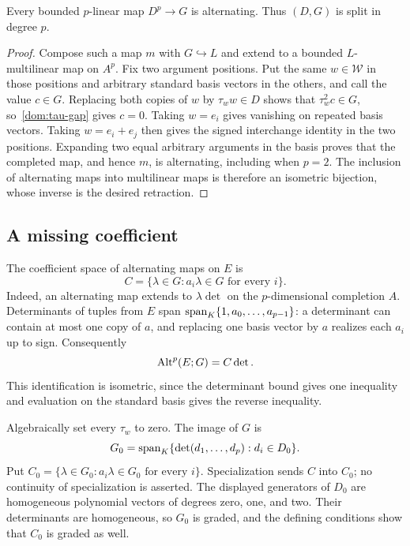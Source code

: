 \begin{lemma}\label{dom:all-alt}
Every bounded $p$\nobreakdash-linear map $D^p\to G$ is alternating. Thus $(D,G)$ is split in degree $p$.
\end{lemma}

\begin{proof}
Compose such a map $m$ with $G\hookrightarrow L$ and extend to a bounded $L$\nobreakdash-multilinear map
on $A^p$. Fix two argument positions. Put the same $w\in\mathcal W$ in those positions and arbitrary
standard basis vectors in the others, and call the value $c\in G$. Replacing both copies of $w$ by
$\tau_w w\in D$ shows that $\tau_w^2c\in G$, so~\eqref{dom:tau-gap} gives $c=0$.
Taking $w=e_i$ gives vanishing on repeated basis vectors. Taking $w=e_i+e_j$ then gives the signed
interchange identity in the two positions. Expanding two equal arbitrary arguments in the basis proves
that the completed map, and hence $m$, is alternating, including when $p=2$. The inclusion of alternating
maps into multilinear maps is therefore an isometric bijection, whose inverse is the desired retraction.
\end{proof}

\subsection{A missing coefficient}

The coefficient space of alternating maps on $E$ is
\[
C=\{\lambda\in G:a_i\lambda\in G\text{ for every }i\}.
\]
Indeed, an alternating map extends to $\lambda\det$ on the $p$\nobreakdash-dimensional completion $A$.
Determinants of tuples from $E$ span $\operatorname{span}_K\{1,a_0,\ldots,a_{p-1}\}$: a determinant can contain at
most one copy of $a$, and replacing one basis vector by $a$ realizes each $a_i$ up to sign. Consequently
\begin{equation}\label{dom:coefficient-space}
\operatorname{Alt}^p(E;G)=C\det.
\end{equation}
This identification is isometric, since the determinant bound gives one inequality and evaluation on the
standard basis gives the reverse inequality.

Algebraically set every $\tau_w$ to zero. The image of $G$ is
\[
G_0=\operatorname{span}_K\{\det(d_1,\ldots,d_p):d_i\in D_0\}.
\]
Put $C_0=\{\lambda\in G_0:a_i\lambda\in G_0\text{ for every }i\}$. Specialization sends $C$ into $C_0$;
no continuity of specialization is asserted. The displayed generators of $D_0$ are homogeneous polynomial
vectors of degrees zero, one, and two. Their determinants are homogeneous, so $G_0$ is graded, and the
defining conditions show that $C_0$ is graded as well.


